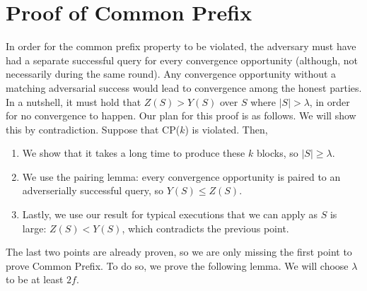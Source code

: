 \section{Proof of Common Prefix}
In order for the common prefix property to be violated, the adversary must have had a separate successful query for every convergence opportunity (although, not necessarily during the same round). Any convergence opportunity without a matching adversarial success would lead to convergence among the honest parties. In a nutshell, it must hold that $Z(S) > Y(S)$ over $S$ where $|S|>\lambda$, in order for no convergence to happen.
Our plan for this proof is as follows. We will show this by contradiction. Suppose that CP($k$) is violated. Then,
\begin{enumerate}
    \item We show that it takes a long time to produce these $k$ blocks, so $|S| \geq \lambda$.
    \item We use the pairing lemma: every convergence opportunity is paired to an adverserially successful query, so $Y(S) \leq Z(S)$.
    \item  Lastly, we use our result for typical executions that we can apply as $S$ is large: $Z(S) < Y(S)$, which contradicts the previous point.
\end{enumerate}
The last two points are already proven, so we are only missing the first point to prove Common Prefix.
To do so, we prove the following lemma. We will choose $\lambda$ to be at least $2f$.

